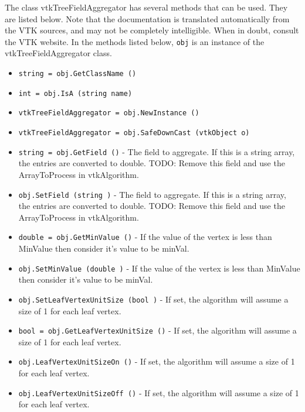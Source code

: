 The class vtkTreeFieldAggregator has several methods that can be used.
  They are listed below.
Note that the documentation is translated automatically from the VTK sources,
and may not be completely intelligible.  When in doubt, consult the VTK website.
In the methods listed below, \verb|obj| is an instance of the vtkTreeFieldAggregator class.
\begin{itemize}
\item  \verb|string = obj.GetClassName ()|

\item  \verb|int = obj.IsA (string name)|

\item  \verb|vtkTreeFieldAggregator = obj.NewInstance ()|

\item  \verb|vtkTreeFieldAggregator = obj.SafeDownCast (vtkObject o)|

\item  \verb|string = obj.GetField ()| -  The field to aggregate.  If this is a string array, the entries are converted to double.
 TODO: Remove this field and use the ArrayToProcess in vtkAlgorithm.

\item  \verb|obj.SetField (string )| -  The field to aggregate.  If this is a string array, the entries are converted to double.
 TODO: Remove this field and use the ArrayToProcess in vtkAlgorithm.

\item  \verb|double = obj.GetMinValue ()| -  If the value of the vertex is less than MinValue then consider it's value to be minVal.

\item  \verb|obj.SetMinValue (double )| -  If the value of the vertex is less than MinValue then consider it's value to be minVal.

\item  \verb|obj.SetLeafVertexUnitSize (bool )| -  If set, the algorithm will assume a size of 1 for each leaf vertex.

\item  \verb|bool = obj.GetLeafVertexUnitSize ()| -  If set, the algorithm will assume a size of 1 for each leaf vertex.

\item  \verb|obj.LeafVertexUnitSizeOn ()| -  If set, the algorithm will assume a size of 1 for each leaf vertex.

\item  \verb|obj.LeafVertexUnitSizeOff ()| -  If set, the algorithm will assume a size of 1 for each leaf vertex.


\end{itemize}
